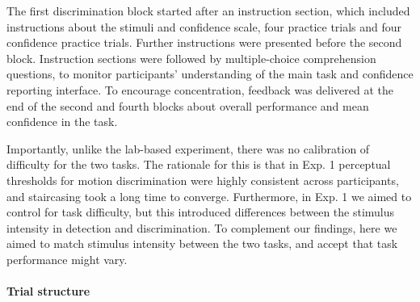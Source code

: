 \documentclass[12pt,twoside]{reedthesis}
\begin{document}
The first discrimination block started after an instruction section, which included instructions about the stimuli and confidence scale, four practice trials and four confidence practice trials. Further instructions were presented before the second block. Instruction sections were followed by multiple-choice comprehension questions, to monitor participants' understanding of the main task and confidence reporting interface. To encourage concentration, feedback was delivered at the end of the second and fourth blocks about overall performance and mean confidence in the task.

Importantly, unlike the lab-based experiment, there was no calibration of difficulty for the two tasks. The rationale for this is that in Exp. 1 perceptual thresholds for motion discrimination were highly consistent across participants, and staircasing took a long time to converge. Furthermore, in Exp. 1 we aimed to control for task difficulty, but this introduced differences between the stimulus intensity in detection and discrimination. To complement our findings, here we aimed to match stimulus intensity between the two tasks, and accept that task performance might vary.

\hypertarget{trial-structure}{%
\paragraph*{Trial structure}\label{trial-structure}}
\end{document}
